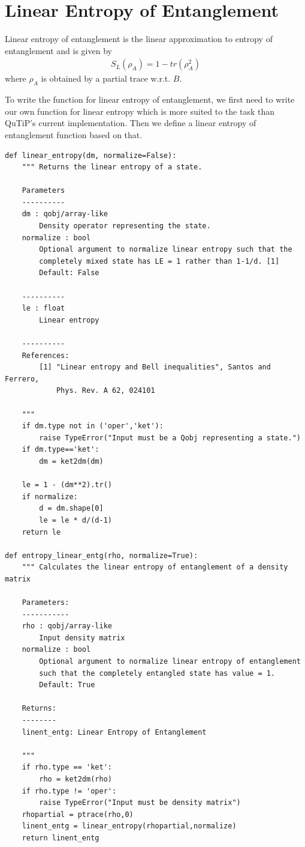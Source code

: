 \section{Linear Entropy of Entanglement}
Linear entropy of entanglement is the linear approximation to entropy of entanglement and is given by
\begin{align*}
S_L(\rho_A) = 1 - tr(\rho_A^2)
\end{align*}
where $\rho_A$ is obtained by a partial trace w.r.t. $B$.
\par To write the function for linear entropy of entanglement, we first need to write our own function for linear entropy which is more suited to the task than QuTiP's current implementation. Then we define a linear entropy of entanglement function based on that.
\begin{verbatim}
def linear_entropy(dm, normalize=False):
    """ Returns the linear entropy of a state.
    
    Parameters
    ----------
    dm : qobj/array-like
        Density operator representing the state.
    normalize : bool
        Optional argument to normalize linear entropy such that the
        completely mixed state has LE = 1 rather than 1-1/d. [1]
        Default: False
    
    ----------
    le : float
        Linear entropy
        
    ----------
    References:
        [1] "Linear entropy and Bell inequalities", Santos and Ferrero,
            Phys. Rev. A 62, 024101
    
    """
    if dm.type not in ('oper','ket'):
        raise TypeError("Input must be a Qobj representing a state.")
    if dm.type=='ket':
        dm = ket2dm(dm)
    
    le = 1 - (dm**2).tr()
    if normalize:
        d = dm.shape[0]
        le = le * d/(d-1)
    return le

def entropy_linear_entg(rho, normalize=True):
    """ Calculates the linear entropy of entanglement of a density matrix
    
    Parameters:
    -----------
    rho : qobj/array-like
        Input density matrix
    normalize : bool
        Optional argument to normalize linear entropy of entanglement
        such that the completely entangled state has value = 1.
        Default: True
    
    Returns:
    --------
    linent_entg: Linear Entropy of Entanglement
    
    """
    if rho.type == 'ket':
        rho = ket2dm(rho)
    if rho.type != 'oper':
        raise TypeError("Input must be density matrix")
    rhopartial = ptrace(rho,0)
    linent_entg = linear_entropy(rhopartial,normalize)
    return linent_entg
\end{verbatim}

